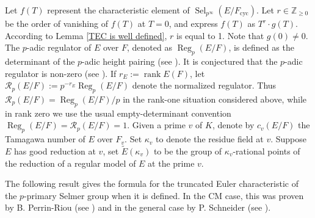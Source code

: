 \documentclass[12pt]{amsart}
\numberwithin{equation}{section}
\begin{document}
\par Let $f(T)$ represent the characteristic element of $\operatorname{Sel}_{p^\infty}(E/F_{\operatorname{cyc}})$. Let $r\in \mathbb{Z}_{\geq 0}$ be the order of vanishing of $f(T)$ at $T=0$, and express $f(T)$ as $T^r \cdot g(T)$. According to Lemma \ref{TEC is well defined}, $r$ is equal to 1. Note that $g(0) \neq 0$. The $p$-adic regulator of $E$ over $F$, denoted as $\operatorname{Reg}_p(E/F)$, is defined as the determinant of the $p$-adic height pairing (see \cite{schneiderhp1}). It is conjectured that the $p$-adic regulator is non-zero (see \cite{Schneider85}). If $r_E:=\operatorname{rank}E(F)$, let $\mathcal{R}_p(E/F):=p^{-r_E}\operatorname{Reg}_p(E/F)$ denote the normalized regulator. Thus $\mathcal{R}_p(E/F)=\operatorname{Reg}_p(E/F)/p$ in the rank-one situation considered above, while in rank zero we use the usual empty-determinant convention $\operatorname{Reg}_p(E/F)=\mathcal{R}_p(E/F)=1$. Given a prime $v$ of $K$, denote by $c_v(E/F)$ the Tamagawa number of $E$ over $F_v$. Set $\kappa_v$ to denote the residue field at $v$. Suppose $E$ has good reduction at $v$, set $\widetilde{E}(\kappa_v)$ to be the group of $\kappa_v$-rational points of the reduction of a regular model of $E$ at the prime $v$. 
\par The following result gives the formula for the truncated Euler characteristic of the $p$-primary Selmer group when it is defined.
 In the CM case, this was proven by B. Perrin-Riou (see \cite{PR82}) and in the general case by P. Schneider (see \cite{Schneider85}).
\end{document}
